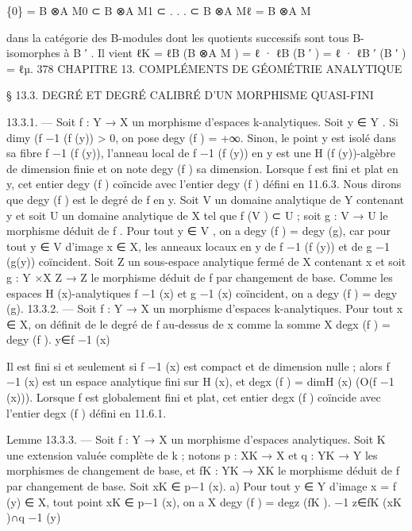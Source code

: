 \documentclass[
  10pt,
]{article}
\newenvironment{Shaded}{}{}
\newcommand{\NormalTok}[1]{#1}
\begin{document}
\begin{Shaded}
\begin{Highlighting}[]
\NormalTok{                \{0\} = B ⊗A M0 ⊂ B ⊗A M1 ⊂ . . . ⊂ B ⊗A Mℓ = B ⊗A M}

\NormalTok{dans la catégorie des B{-}modules dont les quotients successifs sont tous B{-}isomorphes à}
\NormalTok{B ′ . Il vient}
\NormalTok{                    ℓK = ℓB (B ⊗A M ) = ℓ · ℓB (B ′ ) = ℓ · ℓB ′ (B ′ ) = ℓµ.}
\NormalTok{378              CHAPITRE 13. COMPLÉMENTS DE GÉOMÉTRIE ANALYTIQUE}

\NormalTok{§ 13.3. DEGRÉ ET DEGRÉ CALIBRÉ D’UN MORPHISME QUASI{-}FINI}

\NormalTok{13.3.1. — Soit f : Y → X un morphisme d’espaces k{-}analytiques. Soit y ∈ Y . Si}
\NormalTok{dimy (f −1 (f (y)) \textgreater{} 0, on pose degy (f ) = +∞. Sinon, le point y est isolé dans sa fibre}
\NormalTok{f −1 (f (y)), l’anneau local de f −1 (f (y)) en y est une H (f (y)){-}algèbre de dimension finie}
\NormalTok{et on note degy (f ) sa dimension.}
\NormalTok{   Lorsque f est fini et plat en y, cet entier degy (f ) coïncide avec l’entier degy (f ) défini}
\NormalTok{en 11.6.3.}
\NormalTok{   Nous dirons que degy (f ) est le degré de f en y.}
\NormalTok{   Soit V un domaine analytique de Y contenant y et soit U un domaine analytique}
\NormalTok{de X tel que f (V ) ⊂ U ; soit g : V → U le morphisme déduit de f . Pour tout y ∈ V , on}
\NormalTok{a degy (f ) = degy (g), car pour tout y ∈ V d’image x ∈ X, les anneaux locaux en y de}
\NormalTok{f −1 (f (y)) et de g −1 (g(y)) coïncident.}
\NormalTok{   Soit Z un sous{-}espace analytique fermé de X contenant x et soit g : Y ×X Z → Z le}
\NormalTok{morphisme déduit de f par changement de base. Comme les espaces H (x){-}analytiques}
\NormalTok{f −1 (x) et g −1 (x) coïncident, on a degy (f ) = degy (g).}
\NormalTok{13.3.2. — Soit f : Y → X un morphisme d’espaces k{-}analytiques. Pour tout x ∈ X,}
\NormalTok{on définit de le degré de f au{-}dessus de x comme la somme}
\NormalTok{                                            X}
\NormalTok{                               degx (f ) =     degy (f ).}
\NormalTok{                                              y∈f −1 (x)}


\NormalTok{Il est fini si et seulement si f −1 (x) est compact et de dimension nulle ; alors f −1 (x) est}
\NormalTok{un espace analytique fini sur H (x), et degx (f ) = dimH (x) (O(f −1 (x))).}
\NormalTok{   Lorsque f est globalement fini et plat, cet entier degx (f ) coïncide avec l’entier degx (f )}
\NormalTok{défini en 11.6.1.}

\NormalTok{Lemme 13.3.3. — Soit f : Y → X un morphisme d’espaces analytiques. Soit K une}
\NormalTok{extension valuée complète de k ; notons p : XK → X et q : YK → Y les morphismes de}
\NormalTok{changement de base, et fK : YK → XK le morphisme déduit de f par changement de}
\NormalTok{base. Soit xK ∈ p−1 (x).}
\NormalTok{  a) Pour tout y ∈ Y d’image x = f (y) ∈ X, tout point xK ∈ p−1 (x), on a}
\NormalTok{                                        X}
\NormalTok{                         degy (f ) =              degz (fK ).}
\NormalTok{                                           −1}
\NormalTok{                                        z∈fK  (xK )∩q −1 (y)}



\end{Highlighting}
\end{Shaded}
\end{document}
